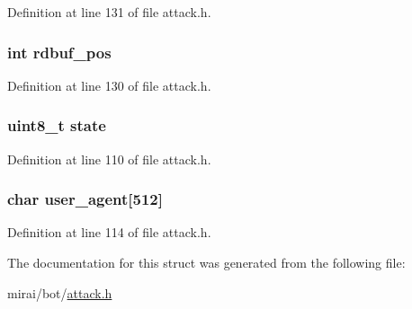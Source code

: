 Definition at line 131 of file attack.\+h.

\subsubsection[{\texorpdfstring{rdbuf\+\_\+pos}{rdbuf_pos}}]{\setlength{\rightskip}{0pt plus 5cm}int rdbuf\+\_\+pos}\hypertarget{structattack__http__state_abd4c86054fbe97fb3b12d233da01798d}{}\label{structattack__http__state_abd4c86054fbe97fb3b12d233da01798d}


Definition at line 130 of file attack.\+h.

\subsubsection[{\texorpdfstring{state}{state}}]{\setlength{\rightskip}{0pt plus 5cm}uint8\+\_\+t state}\hypertarget{structattack__http__state_a0b57aa10271a66f3dc936bba1d2f3830}{}\label{structattack__http__state_a0b57aa10271a66f3dc936bba1d2f3830}


Definition at line 110 of file attack.\+h.

\subsubsection[{\texorpdfstring{user\+\_\+agent}{user_agent}}]{\setlength{\rightskip}{0pt plus 5cm}char user\+\_\+agent\mbox{[}512\mbox{]}}\hypertarget{structattack__http__state_ad822f3afc6ca96d5e6968831ba0c9d25}{}\label{structattack__http__state_ad822f3afc6ca96d5e6968831ba0c9d25}


Definition at line 114 of file attack.\+h.



The documentation for this struct was generated from the following file\+:\begin{DoxyCompactItemize}
\item 
mirai/bot/\hyperlink{attack_8h}{attack.\+h}\end{DoxyCompactItemize}
